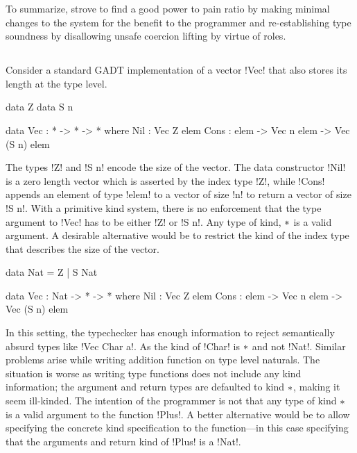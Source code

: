 \documentclass[screen,nonacm,manuscript,review]{acmart} %
\begin{document}
To summarize, \SFR strove to find a good power to pain ratio by making minimal changes to the system for the benefit to the programmer and re-establishing type soundness by disallowing unsafe coercion lifting by virtue of roles.

\subsection{\SFP}\label{sec:sfp} %
Consider a standard GADT implementation of a vector !Vec! that also stores its length at the type level.

\begin{minipage}[ht]{0.4\linewidth}
\begin{code}
        data Z
        data S n
\end{code}
\end{minipage}%
\begin{minipage}[ht]{0.4\linewidth}
\begin{code}
    data Vec : * -> * -> * where
       Nil : Vec Z elem
       Cons : elem -> Vec n elem -> Vec (S n) elem
\end{code}
\end{minipage}

The types !Z! and !S n! encode the size of the vector. The data
constructor !Nil! is a zero length vector which is asserted by the
index type !Z!, while !Cons! appends an element of type !elem! to a
vector of size !n! to return a vector of size !S n!. With a primitive
kind system, there is no enforcement that the type argument to !Vec!
has to be either !Z! or !S n!. Any type of kind, $\ast$ is a valid
argument. A desirable alternative would be to restrict the kind
of the index type that describes the size of the vector.

\begin{minipage}[ht]{0.4\linewidth}
\begin{code}
         data Nat = Z | S Nat
\end{code}
\end{minipage}%
\begin{minipage}[ht]{0.4\linewidth}
\begin{code}
     data Vec : Nat -> * -> * where
        Nil : Vec Z elem
        Cons : elem -> Vec n elem -> Vec (S n) elem
\end{code}
\end{minipage}

In this setting, the typechecker has enough information to reject
semantically absurd types like !Vec Char a!. As the kind of !Char! is
$\ast$ and not !Nat!. Similar problems arise while writing addition function on type level
naturals. The situation is worse as writing type functions does not
include any kind information; the argument and return types are
defaulted to kind $\ast$, making it seem ill-kinded. The intention of
the programmer is not that any type of kind $\ast$ is a valid
argument to the function !Plus!. A better alternative would be to
allow specifying the concrete kind specification to the function---in
this case specifying that the arguments and return kind of !Plus! is a
!Nat!.
\end{document}
